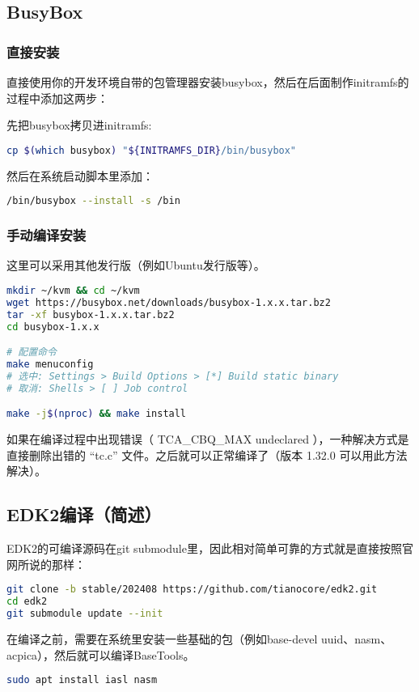 \subsection{BusyBox}
\subsubsection{直接安装}
直接使用你的开发环境自带的包管理器安装busybox，然后在后面制作initramfs的过程中添加这两步：

先把busybox拷贝进initramfs:
\begin{lstlisting}[language=bash]
cp $(which busybox) "${INITRAMFS_DIR}/bin/busybox"
\end{lstlisting}

然后在系统启动脚本里添加：
\begin{lstlisting}[language=bash]
/bin/busybox --install -s /bin
\end{lstlisting}
\subsubsection{手动编译安装}
这里可以采用其他发行版（例如Ubuntu发行版等）。
\begin{lstlisting}[language=bash]
mkdir ~/kvm && cd ~/kvm
wget https://busybox.net/downloads/busybox-1.x.x.tar.bz2
tar -xf busybox-1.x.x.tar.bz2
cd busybox-1.x.x

# 配置命令
make menuconfig
# 选中: Settings > Build Options > [*] Build static binary
# 取消: Shells > [ ] Job control

make -j$(nproc) && make install
\end{lstlisting}
如果在编译过程中出现错误（ TCA\_CBQ\_MAX undeclared ），一种解决方式是直接删除出错的 “tc.c” 文件。之后就可以正常编译了（版本 1.32.0 可以用此方法解决）。

\subsection{EDK2编译（简述）}
EDK2的可编译源码在git submodule里，因此相对简单可靠的方式就是直接按照官网所说的那样：
\begin{lstlisting}[language=bash]
git clone -b stable/202408 https://github.com/tianocore/edk2.git
cd edk2
git submodule update --init
\end{lstlisting}

在编译之前，需要在系统里安装一些基础的包（例如base-devel uuid、nasm、acpica），然后就可以编译BaseTools。

\begin{lstlisting}[language=bash]
    sudo apt install iasl nasm
\end{lstlisting}

